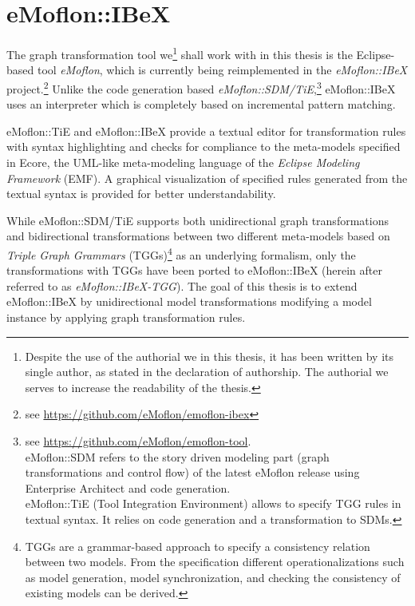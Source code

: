 \section{eMoflon::IBeX}
\label{emoflon-ibex}
The graph transformation tool we\footnote{Despite the use of the authorial we in this thesis, it has been written by its single author, as stated in the declaration of authorship.
The authorial we serves to increase the readability of the thesis.} shall work with in this thesis is the Eclipse-based tool \textit{eMoflon}, which is currently being reimplemented in the \textit{eMoflon::IBeX} project.\footnote{see \url{https://github.com/eMoflon/emoflon-ibex}}
Unlike the code generation based \textit{eMoflon::SDM/TiE},\footnote{see \url{https://github.com/eMoflon/emoflon-tool}. \\
	eMoflon::SDM refers to the story driven modeling part (graph transformations and control flow) of the latest eMoflon release using Enterprise Architect and code generation. \\
	eMoflon::TiE (Tool Integration Environment) allows to specify TGG rules in textual syntax. It relies on code generation and a transformation to SDMs.}
eMoflon::IBeX uses an interpreter which is completely based on incremental pattern matching.

eMoflon::TiE and eMoflon::IBeX provide a textual editor for transformation rules with syntax highlighting and checks for compliance to the meta-models specified in Ecore, the UML-like meta-modeling language of the \textit{Eclipse Modeling Framework} (EMF).
A graphical visualization of specified rules generated from the textual syntax is provided for better understandability.

While eMoflon::SDM/TiE supports both unidirectional graph transformations and bidirectional transformations between two different meta-models based on \textit{Triple Graph Grammars} (TGGs)\footnote{TGGs \cite{TGGs} are a grammar-based approach to specify a consistency relation between two models.
From the specification different operationalizations such as model generation, model synchronization, and checking the consistency of existing models can be derived.} as an underlying formalism, only the transformations with TGGs have been ported to eMoflon::IBeX (herein after referred to as \textit{eMoflon::IBeX-TGG}).
The goal of this thesis is to extend eMoflon::IBeX by unidirectional model transformations modifying a model instance by applying graph transformation rules.


